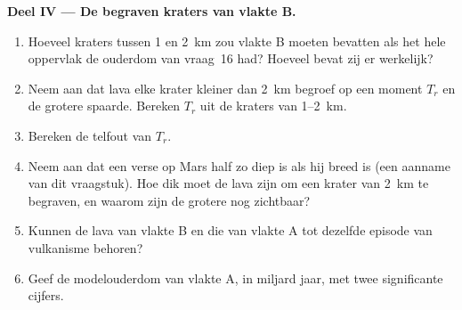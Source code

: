 \begin{problem}
\medskip\noindent\textbf{Deel IV --- De begraven kraters van vlakte B.}
\begin{enumerate}[resume]
\item Hoeveel kraters tussen 1 en \qty{2}{km} zou vlakte B moeten bevatten als
  het hele oppervlak de ouderdom van vraag~16 had? Hoeveel bevat zij er werkelijk?
\item Neem aan dat lava elke krater kleiner dan \qty{2}{km} begroef op een
  moment $T_r$ en de grotere spaarde. Bereken $T_r$ uit de kraters van
  \num{1}--\qty{2}{km}.
\item Bereken de telfout van $T_r$.
\item Neem aan dat een verse  op Mars half zo diep is als
  hij breed is (een aanname van dit vraagstuk). Hoe dik moet de lava zijn om
  een krater van \qty{2}{km} te begraven, en waarom zijn de grotere nog zichtbaar?
\item Kunnen de lava van vlakte B en die van vlakte A tot dezelfde episode
  van vulkanisme behoren?
\item Geef de modelouderdom van vlakte A, in miljard jaar, met twee
  significante cijfers.
\end{enumerate}
\end{problem}
